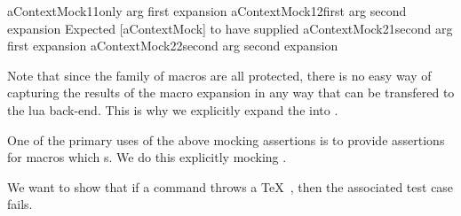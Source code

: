\startConTest
\begingroup
  \assertMacroNthArgumentOnMthExpansionMatches%
    {aContextMock}{1}{1}{only arg first expansion}{}
  \assertMacroNthArgumentOnMthExpansionMatches%
    {aContextMock}{1}{2}{first arg second expansion}{}
  \startAssertShouldFail{}%
    {Expected [aContextMock] to have supplied}%
    {}
    \assertMacroNthArgumentOnMthExpansionMatches%
      {aContextMock}{2}{1}{second arg first expansion}{}
  \stopAssertShouldFail
  \assertMacroNthArgumentOnMthExpansionMatches%
    {aContextMock}{2}{2}{second arg second expansion}{}
  \stopLoggingExpansions
\endgroup
\stopConTest
\stopTestCase

\stopTestSuite



Note that since the  family of macros are all 
protected, there is no easy way of capturing the results of the macro 
expansion in any way that can be transfered to the lua back-end. This is 
why we explicitly expand the \type{\aContextMock[anArg]} into 
. 


\startConTest
\begingroup
\endgroup
\stopConTest
\stopTestCase

\stopTestSuite

\startTestSuite[assertErrorThrown]

One of the primary uses of the above mocking assertions is to provide 
assertions for macros which  \type{\errmessage}s. We do this 
explicitly mocking \type{\errmessage}. 

\startMkIVCode
\def\mockErrMessage{%
  \mockTexMacro{errmessage}{1}
}
\def\assertErrorThrown#1{%
  \assertMacroExpanded{errmessage}{#1}
}
\stopMkIVCode


We want to show that if a command throws a \TeX\ \type{\errmessage}, then 
the associated test case fails. 

